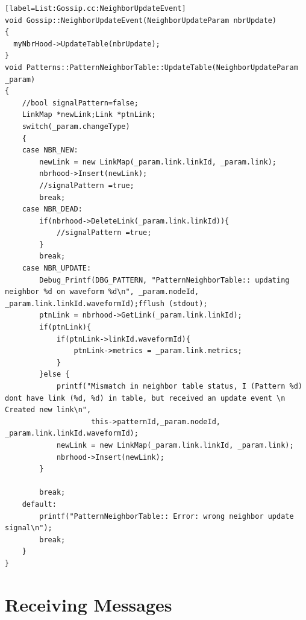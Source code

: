 \begin{lstlisting}[style=boralargefile][label=List:Gossip.cc:NeighborUpdateEvent]
void Gossip::NeighborUpdateEvent(NeighborUpdateParam nbrUpdate)
{
  myNbrHood->UpdateTable(nbrUpdate);
}
void Patterns::PatternNeighborTable::UpdateTable(NeighborUpdateParam _param)
{
	//bool signalPattern=false;
	LinkMap *newLink;Link *ptnLink;
	switch(_param.changeType)
	{
	case NBR_NEW:
		newLink = new LinkMap(_param.link.linkId, _param.link);
		nbrhood->Insert(newLink);
		//signalPattern =true;
		break;
	case NBR_DEAD:
		if(nbrhood->DeleteLink(_param.link.linkId)){
			//signalPattern =true;
		}
		break;
	case NBR_UPDATE:
		Debug_Printf(DBG_PATTERN, "PatternNeighborTable:: updating neighbor %d on waveform %d\n", _param.nodeId, _param.link.linkId.waveformId);fflush (stdout);
		ptnLink = nbrhood->GetLink(_param.link.linkId);
		if(ptnLink){
			if(ptnLink->linkId.waveformId){
				ptnLink->metrics = _param.link.metrics;
			}
		}else {
			printf("Mismatch in neighbor table status, I (Pattern %d) dont have link (%d, %d) in table, but received an update event \n Created new link\n",
					this->patternId,_param.nodeId, _param.link.linkId.waveformId);
			newLink = new LinkMap(_param.link.linkId, _param.link);
			nbrhood->Insert(newLink);
		}

		break;
	default:
		printf("PatternNeighborTable:: Error: wrong neighbor update signal\n");
		break;
	}
}
\end{lstlisting}

\section {Receiving Messages} \label{sec:ReceiveMessageEvent}

